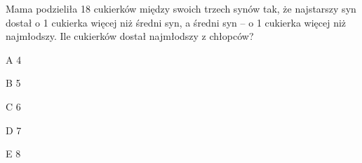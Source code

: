 \begin{tresc}
Mama podzieliła 18 cukierków między swoich trzech synów tak, że najstarszy syn dostał o 1 cukierka więcej niż średni syn, a średni syn – o 1 cukierka więcej niż najmłodszy. Ile cukierków dostał najmłodszy z chłopców?
\end{tresc}
\begin{wariant}{A} 4 \end{wariant}
\begin{wariant}{B} 5 \end{wariant}
\begin{wariant}{C} 6 \end{wariant}
\begin{wariant}{D} 7 \end{wariant}
\begin{wariant}{E} 8 \end{wariant}
